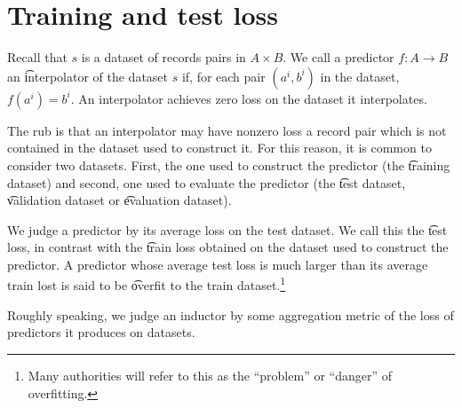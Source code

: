 \section*{Training and test loss}

Recall that $s$ is a dataset of records pairs in $A \times B$.
We call a predictor $f: A \to B$ an \t{interpolator} of the dataset $s$ if, for each pair $(a^i, b^i)$ in the dataset, $f(a^i) = b^i$.
An interpolator achieves zero loss on the dataset it interpolates.

The rub is that an interpolator may have nonzero loss a record pair which is not contained in the dataset used to construct it.
For this reason, it is common to consider two datasets.
First, the one used to construct the predictor (the \t{training dataset}) and second, one used to evaluate the predictor (the \t{test dataset}, \t{validation dataset} or \t{evaluation dataset}).

We judge a predictor by its average loss on the test dataset.
We call this the \t{test loss}, in contrast with the \t{train loss} obtained on the dataset used to construct the predictor.
A predictor whose average test loss is much larger than its average train lost is said to be \t{overfit} to the train dataset.\footnote{Many authorities will refer to this as the ``problem'' or ``danger'' of overfitting.}

Roughly speaking, we judge an inductor by some aggregation metric of the loss of predictors it produces on datasets.
